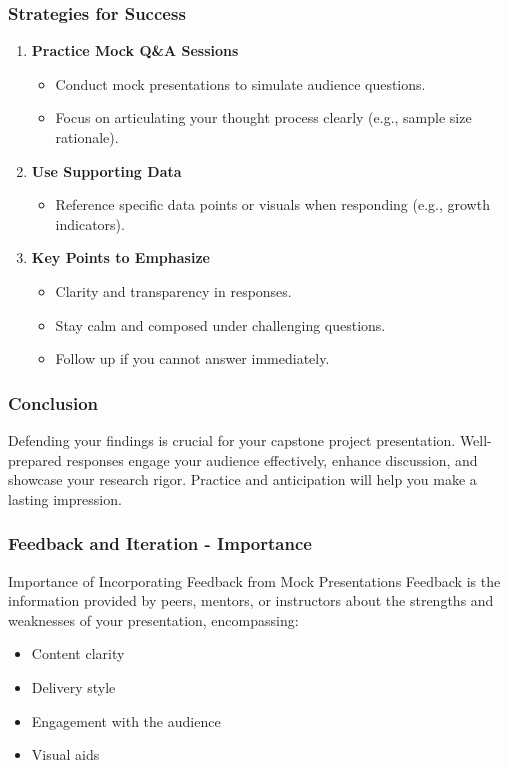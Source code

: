 \documentclass{beamer}
\begin{document}
\begin{frame}[fragile]
    \frametitle{Strategies for Success}
    \begin{enumerate}
        \item \textbf{Practice Mock Q\&A Sessions}
        \begin{itemize}
            \item Conduct mock presentations to simulate audience questions.
            \item Focus on articulating your thought process clearly (e.g., sample size rationale).
        \end{itemize}
        \item \textbf{Use Supporting Data}
        \begin{itemize}
            \item Reference specific data points or visuals when responding (e.g., growth indicators).
        \end{itemize}
        \item \textbf{Key Points to Emphasize}
        \begin{itemize}
            \item Clarity and transparency in responses.
            \item Stay calm and composed under challenging questions.
            \item Follow up if you cannot answer immediately.
        \end{itemize}
    \end{enumerate}
\end{frame}

\begin{frame}[fragile]
    \frametitle{Conclusion}
    Defending your findings is crucial for your capstone project presentation. Well-prepared responses engage your audience effectively, enhance discussion, and showcase your research rigor. Practice and anticipation will help you make a lasting impression.
\end{frame}

\begin{frame}[fragile]
    \frametitle{Feedback and Iteration - Importance}
    \begin{block}{Importance of Incorporating Feedback from Mock Presentations}
        Feedback is the information provided by peers, mentors, or instructors about the strengths and weaknesses of your presentation, encompassing:
        \begin{itemize}
            \item Content clarity
            \item Delivery style
            \item Engagement with the audience
            \item Visual aids
        \end{itemize}
    \end{block}
\end{frame}
\end{document}
